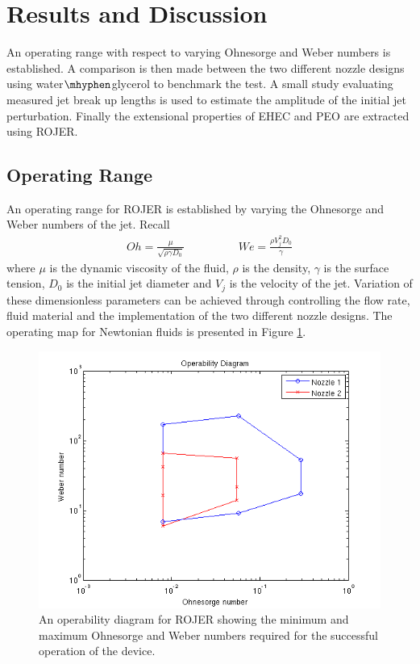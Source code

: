 \documentclass[11pt]{article}
\begin{document}
\newpage

\section{Results and Discussion}
An operating range with respect to varying Ohnesorge and Weber numbers is established. A comparison is then made between the two different nozzle designs using water$\mhyphen$glycerol to benchmark the test. A small study evaluating measured jet break up lengths is used to estimate the amplitude of the initial jet perturbation. Finally the extensional properties of EHEC and PEO are extracted using ROJER.

\subsection{Operating Range} \label{sec:operating}
An operating range for ROJER is established by varying the Ohnesorge and Weber numbers of the jet. Recall
\begin{align}
Oh = \frac{\mu}{\sqrt{\rho \gamma D_0}} \hspace{2cm} We = \frac{\rho V_j^2 D_0}{\gamma}
\end{align}
where $\mu$ is the dynamic viscosity of the fluid, $\rho$ is the density, $\gamma$ is the surface tension, $D_0$ is the initial jet diameter and $V_j$ is the velocity of the jet. Variation of these dimensionless parameters can be achieved through controlling the flow rate, fluid material and the implementation of the two different nozzle designs. The operating map for Newtonian fluids is presented in Figure \ref{fig:operability}.
\begin{figure}[h]
	\begin{center}
		\includegraphics[scale=0.5]{img/operability.png}
		\caption{An operability diagram for ROJER showing the minimum and maximum Ohnesorge and Weber numbers required for the successful operation of the device.}
		\label{fig:operability}
	\end{center}
\end{figure}
\end{document}
